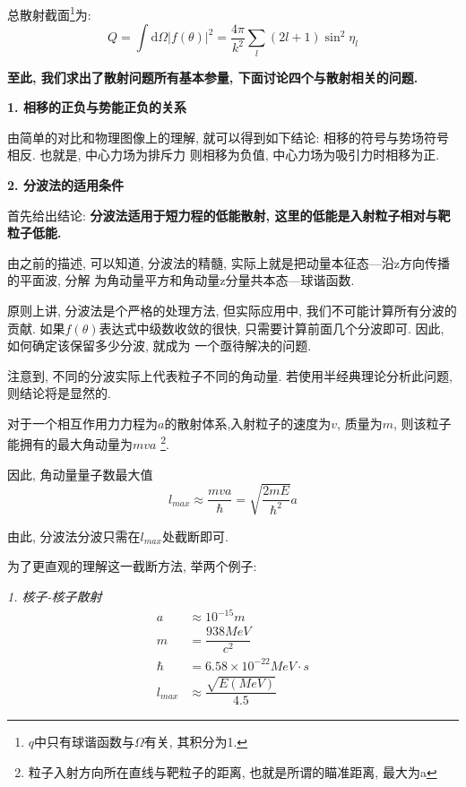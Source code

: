 \documentclass[a4paper, 11pt]{article}
\begin{document}
\begin{spacing}{1.2}
          总散射截面\footnote{$q$中只有球谐函数与$\Omega$有关, 其积分为1.}为:
          \begin{equation} 
            \label{zssjm}
            Q = \int\mathrm{d}\Omega\left|f(\theta)\right|^2 %
              = \dfrac{4\pi}{k^2}\sum_l(2l+1)\sin^2\eta_l
          \end{equation}

          \textbf{至此, 我们求出了散射问题所有基本参量, 下面讨论四个与散射相关的问题.}

          \textbf{1. 相移的正负与势能正负的关系}
            
            由简单的对比和物理图像上的理解, 就可以得到如下结论: 相移的符号与势场符号相反. 也就是, 中心力场为排斥力 
            则相移为负值, 中心力场为吸引力时相移为正.

          \textbf{2. 分波法的适用条件}
            
          首先给出结论:
          \textbf{分波法适用于短力程的低能散射, 这里的低能是入射粒子相对与靶粒子低能.}

          由之前的描述, 可以知道, 分波法的精髓, 实际上就是把动量本征态---沿z方向传播的平面波, 分解
          为角动量平方和角动量z分量共本态---球谐函数. 
          
          原则上讲, 分波法是个严格的处理方法, 但实际应用中, 我们不可能计算所有分波的贡献. 
          如果$f(\theta)$表达式中级数收敛的很快, 只需要计算前面几个分波即可. 因此, 如何确定该保留多少分波, 就成为
          一个亟待解决的问题. 

          注意到, 不同的分波实际上代表粒子不同的角动量. 若使用半经典理论分析此问题, 则结论将是显然的. 

          对于一个相互作用力力程为$a$的散射体系,入射粒子的速度为$v$, 质量为$m$, 则该粒子能拥有的最大角动量为$mva$
          \footnote{粒子入射方向所在直线与靶粒子的距离, 也就是所谓的瞄准距离, 最大为a}. 

          因此, 角动量量子数最大值
          \begin{equation}
            \label{fbftj}
            l_{max} \approx \dfrac{mva}{\hbar} = \sqrt{\dfrac{2mE}{\hbar^2}}a
          \end{equation}

          由此, 分波法分波只需在$l_{max}$处截断即可.

          为了更直观的理解这一截断方法, 举两个例子:

          \emph{1. 核子-核子散射}
          \begin{equation}
            \begin{aligned}
              a &\approx 10^{-15}m\\
              m &= \dfrac{938MeV}{c^2}\\
              \hbar &= 6.58\times10^{-22}MeV\cdot{}s\\
              l_{max} &\approx \dfrac{\sqrt{E(MeV)}}{4.5}
            \end{aligned}
          \end{equation}


\end{spacing}
\end{document}
